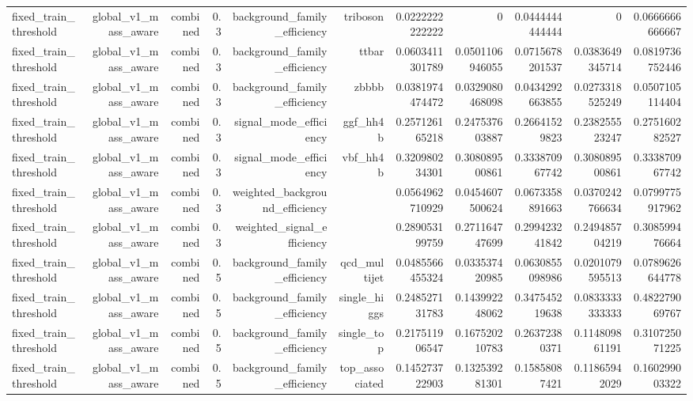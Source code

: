 \begin{table}[htbp]
{\begin{tabular}{lrrrrrrrrrr}
fixed\_train\_threshold & global\_v1\_mass\_aware & combined & 0.3 & background\_family\_efficiency & triboson & 0.0222222222222 & 0 & 0.0444444444444 & 0 & 0.0666666666667 \\
fixed\_train\_threshold & global\_v1\_mass\_aware & combined & 0.3 & background\_family\_efficiency & ttbar & 0.0603411301789 & 0.0501106946055 & 0.0715678201537 & 0.0383649345714 & 0.0819736752446 \\
fixed\_train\_threshold & global\_v1\_mass\_aware & combined & 0.3 & background\_family\_efficiency & zbbbb & 0.0381974474472 & 0.0329080468098 & 0.0434292663855 & 0.0273318525249 & 0.0507105114404 \\
fixed\_train\_threshold & global\_v1\_mass\_aware & combined & 0.3 & signal\_mode\_efficiency & ggf\_hh4b & 0.257126165218 & 0.247537603887 & 0.26641529823 & 0.238255523247 & 0.275160282527 \\
fixed\_train\_threshold & global\_v1\_mass\_aware & combined & 0.3 & signal\_mode\_efficiency & vbf\_hh4b & 0.320980234301 & 0.308089500861 & 0.333870967742 & 0.308089500861 & 0.333870967742 \\
fixed\_train\_threshold & global\_v1\_mass\_aware & combined & 0.3 & weighted\_background\_efficiency &  & 0.0564962710929 & 0.0454607500624 & 0.0673358891663 & 0.0370242766634 & 0.0799775917962 \\
fixed\_train\_threshold & global\_v1\_mass\_aware & combined & 0.3 & weighted\_signal\_efficiency &  & 0.289053199759 & 0.271164747699 & 0.299423241842 & 0.249485704219 & 0.308599476664 \\
fixed\_train\_threshold & global\_v1\_mass\_aware & combined & 0.5 & background\_family\_efficiency & qcd\_multijet & 0.0485566455324 & 0.033537420985 & 0.0630855098986 & 0.0201079595513 & 0.0789626644778 \\
fixed\_train\_threshold & global\_v1\_mass\_aware & combined & 0.5 & background\_family\_efficiency & single\_higgs & 0.248527131783 & 0.143992248062 & 0.347545219638 & 0.0833333333333 & 0.482279069767 \\
fixed\_train\_threshold & global\_v1\_mass\_aware & combined & 0.5 & background\_family\_efficiency & single\_top & 0.217511906547 & 0.167520210783 & 0.26372380371 & 0.114809861191 & 0.310725071225 \\
fixed\_train\_threshold & global\_v1\_mass\_aware & combined & 0.5 & background\_family\_efficiency & top\_associated & 0.145273722903 & 0.132539281301 & 0.15858087421 & 0.11865942029 & 0.160299003322 \\

\end{tabular}}
\end{table}
